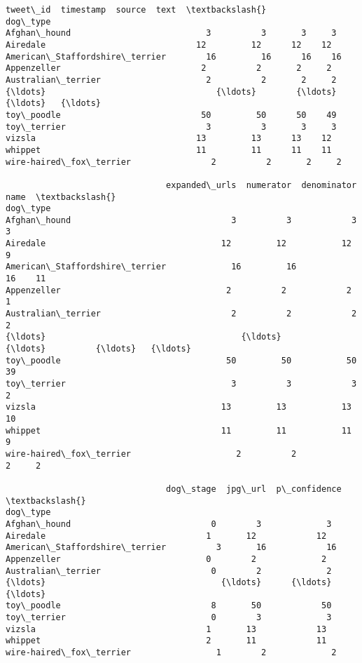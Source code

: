 \documentclass[11pt]{article}
\makeatletter
\newcommand{\boxspacing}{\kern\kvtcb@left@rule\kern\kvtcb@boxsep}
\newcommand{\prompt}[4]{
        {\ttfamily\llap{{\color{#2}[#3]:\hspace{3pt}#4}}\vspace{-\baselineskip}}
    }
\makeatother
\begin{document}
            \begin{tcolorbox}[breakable, size=fbox, boxrule=.5pt, pad at break*=1mm, opacityfill=0]
\prompt{Out}{outcolor}{84}{\boxspacing}
\begin{Verbatim}[commandchars=\\\{\}]
                                tweet\_id  timestamp  source  text  \textbackslash{}
dog\_type
Afghan\_hound                           3          3       3     3
Airedale                              12         12      12    12
American\_Staffordshire\_terrier        16         16      16    16
Appenzeller                            2          2       2     2
Australian\_terrier                     2          2       2     2
{\ldots}                                  {\ldots}        {\ldots}     {\ldots}   {\ldots}
toy\_poodle                            50         50      50    49
toy\_terrier                            3          3       3     3
vizsla                                13         13      13    12
whippet                               11         11      11    11
wire-haired\_fox\_terrier                2          2       2     2

                                expanded\_urls  numerator  denominator  name  \textbackslash{}
dog\_type
Afghan\_hound                                3          3            3     3
Airedale                                   12         12           12     9
American\_Staffordshire\_terrier             16         16           16    11
Appenzeller                                 2          2            2     1
Australian\_terrier                          2          2            2     2
{\ldots}                                       {\ldots}        {\ldots}          {\ldots}   {\ldots}
toy\_poodle                                 50         50           50    39
toy\_terrier                                 3          3            3     2
vizsla                                     13         13           13    10
whippet                                    11         11           11     9
wire-haired\_fox\_terrier                     2          2            2     2

                                dog\_stage  jpg\_url  p\_confidence  \textbackslash{}
dog\_type
Afghan\_hound                            0        3             3
Airedale                                1       12            12
American\_Staffordshire\_terrier          3       16            16
Appenzeller                             0        2             2
Australian\_terrier                      0        2             2
{\ldots}                                   {\ldots}      {\ldots}           {\ldots}
toy\_poodle                              8       50            50
toy\_terrier                             0        3             3
vizsla                                  1       13            13
whippet                                 2       11            11
wire-haired\_fox\_terrier                 1        2             2


\end{Verbatim}
\end{tcolorbox}
\end{document}
